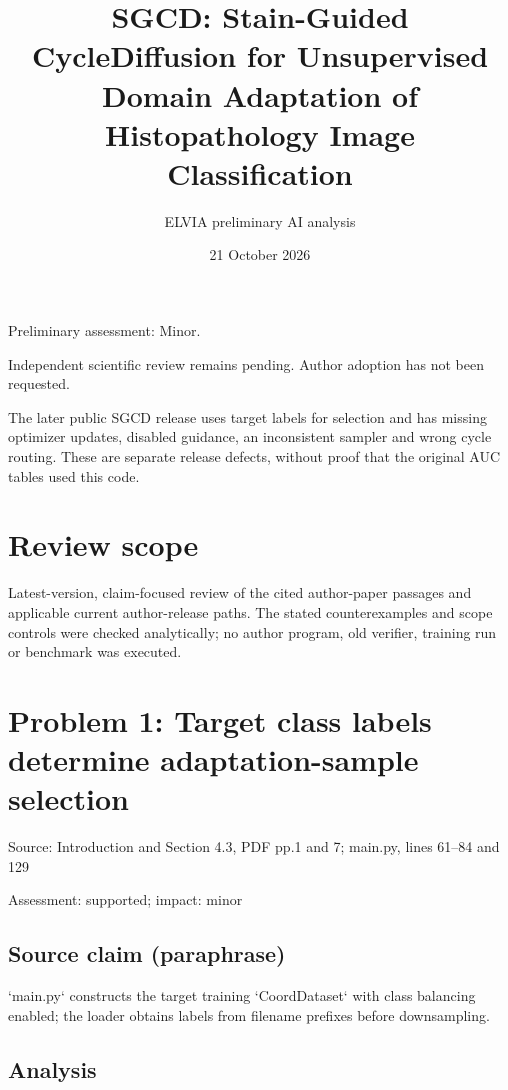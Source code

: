 \documentclass[11pt]{article}
\begin{document}
\title{SGCD: Stain-Guided CycleDiffusion for Unsupervised Domain Adaptation of Histopathology Image Classification}

\author{ELVIA preliminary AI analysis}\date{21 October 2026}\maketitle

Preliminary assessment: Minor.\par

Independent scientific review remains pending. Author adoption has not been requested.

The later public SGCD release uses target labels for selection and has missing optimizer updates, disabled guidance, an inconsistent sampler and wrong cycle routing. These are separate release defects, without proof that the original AUC tables used this code.

\section*{Review scope}

Latest-version, claim-focused review of the cited author-paper passages and applicable current author-release paths. The stated counterexamples and scope controls were checked analytically; no author program, old verifier, training run or benchmark was executed.

\section*{Problem 1: Target class labels determine adaptation-sample selection}

Source: Introduction and Section 4.3, PDF pp.1 and 7; main.py, lines 61–84 and 129

Assessment: supported; impact: minor

\subsection*{Source claim (paraphrase)}

`main.py` constructs the target training `CoordDataset` with class balancing enabled; the loader obtains labels from filename prefixes before downsampling.

\subsection*{Analysis}
\end{document}
